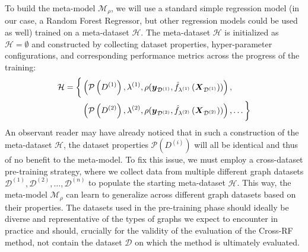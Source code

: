 To build the meta-model \( \mathcal{M}_\rho \), we will use a standard simple regression model (in our case, a Random Forest Regressor, but other regression models could be used as well) trained on a meta-dataset \( \mathcal{H} \).
The meta-dataset \( \mathcal{H} \) is initialized as \( \mathcal{H} = \emptyset \) and constructed by collecting dataset properties, hyper-parameter configurations, and corresponding performance metrics across the progress of the training:
\begin{equation*}
	\begin{split}
		\mathcal{H} = \biggl\{ &\left( \mathcal{P} \left( D^{(1)} \right), \lambda^{(1)}, \rho( \boldsymbol{y}_{\mathcal{D}^{(1)}}, \hat{f}_{\lambda^{(1)}} \left( \boldsymbol{X}_{\mathcal{D}^{(1)}} \right) ) \right), \\
		&\left( \mathcal{P} \left( D^{(2)} \right), \lambda^{(2)}, \rho( \boldsymbol{y}_{\mathcal{D}^{(2)}}, \hat{f}_{\lambda^{(2)}} \left( \boldsymbol{X}_{\mathcal{D}^{(2)}} \right) ) \right), \dots \biggr\}
	\end{split}
\end{equation*}
An observant reader may have already noticed that in such a construction of the meta-dataset \( \mathcal{H} \), the dataset properties \( \mathcal{P} \left( D^{(i)} \right) \) will all be identical and thus of no benefit to the meta-model. To fix this issue, we must employ a cross-dataset pre-training strategy, where we collect data from multiple different graph datasets \( \mathcal{D}^{(1)}, \mathcal{D}^{(2)}, \dots, \mathcal{D}^{(n)} \) to populate the starting meta-dataset \( \mathcal{H} \). This way, the meta-model \( \mathcal{M}_\rho \) can learn to generalize across different graph datasets based on their properties. The datasets used in the pre-training phase should ideally be diverse and representative of the types of graphs we expect to encounter in practice and should, crucially for the validity of the evaluation of the Cross-RF method, not contain the dataset \( \mathcal{D} \) on which the method is ultimately evaluated.
